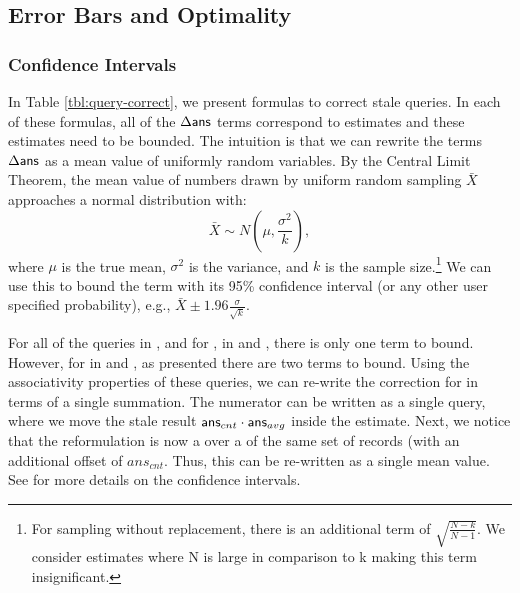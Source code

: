 \subsection{Error Bars and Optimality}\label{subsec:correct-practical}
\subsubsection{Confidence Intervals}
In Table \ref{tbl:query-correct}, we present formulas to correct stale queries.
In each of these formulas, all of the $\Delta\textsf{ans}$ terms correspond to estimates and these estimates need to be bounded.
The intuition is that we can rewrite the terms $\Delta\textsf{ans}$ as a mean value of uniformly random variables.
By the Central Limit Theorem, the mean value of numbers drawn by uniform random sampling $\bar{X}$ approaches a normal distribution with:
\[
\bar{X} \sim N(\mu,\frac{\sigma^2}{k}),
\]
where $\mu$ is the true mean, $\sigma^2$ is the variance, and $k$ is the sample size.\footnote{\scriptsize For sampling without replacement, there is an additional term of $\sqrt{\frac{N-k}{N-1}}$. We consider estimates where N is large in comparison to k making this term insignificant.}
We can use this to bound the term with its 95\% confidence interval (or any other user specified probability), e.g., $\bar{X} \pm 1.96 \frac{\sigma}{\sqrt{k}}$.

For all of the queries in \aggview, and for \sumfunc, \countfunc in \spview and \fjview, there is only one term to bound.
However, for \avgfunc in \spview and \fjview, as presented there are two terms to bound.
Using the associativity properties of these queries, we can re-write the correction for \avgfunc in terms of a single summation.
The numerator can be written as a single \sumfunc query, where we move the stale result $\textsf{ans}_{cnt}\cdot\textsf{ans}_{avg}$ inside the estimate.
Next, we notice that the reformulation is now a \sumfunc over a \countfunc of the same set of records (with an additional offset of $ans_{cnt}$.
Thus, this can be re-written as a single mean value. 
See \cite{wang1999sample} for more details on the confidence intervals.

